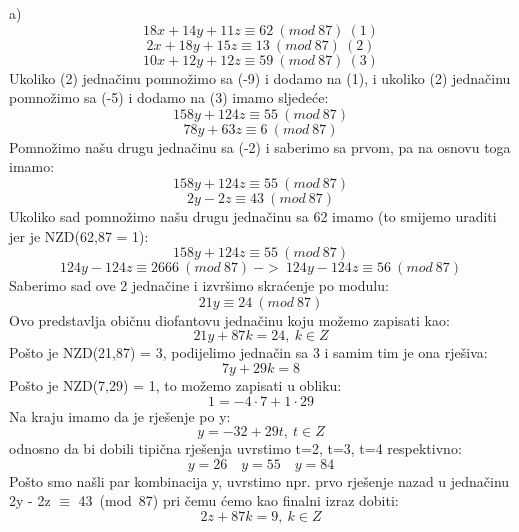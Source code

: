 \documentclass[12pt]{article}
\begin{document}
\begin{enumerate}
		a) \\
\begin{equation*}
18x + 14y + 11z \equiv 62~(mod~87)~(1)
\end{equation*}
\begin{equation*}
2x + 18y + 15z \equiv 13~(mod~87)~(2)
\end{equation*}
\begin{equation*}
10x + 12y + 12z \equiv 59~(mod~87)~(3)
\end{equation*}
Ukoliko (2) jednačinu pomnožimo sa (-9) i dodamo na (1), i ukoliko (2) jednačinu pomnožimo sa (-5) i dodamo na (3) imamo sljedeće:
\begin{equation*}
158y + 124z \equiv 55~(mod~87)
\end{equation*}
\begin{equation*}
78y + 63z \equiv 6~(mod~87)
\end{equation*}
Pomnožimo našu drugu jednačinu sa (-2) i saberimo sa prvom, pa na osnovu toga imamo:
\begin{equation*}
158y + 124z \equiv 55~(mod~87)
\end{equation*}
\begin{equation*}
2y - 2z \equiv 43~(mod~87)
\end{equation*}
Ukoliko sad pomnožimo našu drugu jednačinu sa 62 imamo (to smijemo uraditi jer je NZD(62,87 = 1):
\begin{equation*}
158y + 124z \equiv 55~(mod~87)
\end{equation*}
\begin{equation*}
124y - 124z \equiv 2666~(mod~87)~ -> ~ 124y - 124z \equiv 56~(mod~87)
\end{equation*}
Saberimo sad ove 2 jednačine i izvršimo skraćenje po modulu: 
\begin{equation*}
21y \equiv 24~(mod~87)
\end{equation*}
Ovo predstavlja običnu diofantovu jednačinu koju možemo zapisati kao:
\begin{equation*}
21y + 87k = 24,~k \in Z
\end{equation*}
Pošto je NZD(21,87) = 3, podijelimo jednačin sa 3 i samim tim je ona rješiva:
\begin{equation*}
7y + 29k = 8
\end{equation*}
Pošto je NZD(7,29) = 1, to možemo zapisati u obliku:
\begin{equation*}
1 = -4 \cdot 7 + 1 \cdot 29
\end{equation*}
Na kraju imamo da je rješenje po y:
\begin{equation*}
y = -32 + 29t,~t \in Z
\end{equation*}
odnosno da bi dobili tipična rješenja uvrstimo t=2, t=3, t=4 respektivno:
\begin{equation*}
y = 26 \quad y = 55 \quad y = 84
\end{equation*}		
Pošto smo našli par kombinacija y, uvrstimo npr. prvo rješenje nazad u jednačinu 2y - 2z ${\equiv}$ 43~(mod~87) pri čemu ćemo kao finalni izraz dobiti:
\begin{equation*}
2z + 87k = 9,~k \in Z
\end{equation*}
\newpage


\end{enumerate}
\end{document}
